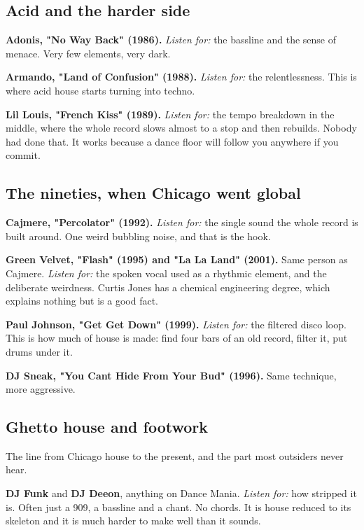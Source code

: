 \subsection{Acid and the harder side}\label{li01_canon-acid-and-the-harder-side}

\textbf{Adonis, "No Way Back" (1986).} \emph{Listen for:} the bassline and the sense of menace. Very
few elements, very dark.

\textbf{Armando, "Land of Confusion" (1988).} \emph{Listen for:} the relentlessness. This is where
acid house starts turning into techno.

\textbf{Lil Louis, "French Kiss" (1989).} \emph{Listen for:} the tempo breakdown in the middle, where
the whole record slows almost to a stop and then rebuilds. Nobody had done that. It works
because a dance floor will follow you anywhere if you commit.

\subsection{The nineties, when Chicago went global}\label{li01_canon-the-nineties-when-chicago-went-global}

\textbf{Cajmere, "Percolator" (1992).} \emph{Listen for:} the single sound the whole record is built
around. One weird bubbling noise, and that is the hook.

\textbf{Green Velvet, "Flash" (1995) and "La La Land" (2001).} Same person as Cajmere. \emph{Listen
for:} the spoken vocal used as a rhythmic element, and the deliberate weirdness. Curtis Jones
has a chemical engineering degree, which explains nothing but is a good fact.

\textbf{Paul Johnson, "Get Get Down" (1999).} \emph{Listen for:} the filtered disco loop. This is how
much of house is made: find four bars of an old record, filter it, put drums under it.

\textbf{DJ Sneak, "You Can\textquotesingle t Hide From Your Bud" (1996).} Same technique, more aggressive.

\subsection{Ghetto house and footwork}\label{li01_canon-ghetto-house-and-footwork}

The line from Chicago house to the present, and the part most outsiders never hear.

\textbf{DJ Funk} and \textbf{DJ Deeon}, anything on Dance Mania. \emph{Listen for:} how stripped it is.
Often just a 909, a bassline and a chant. No chords. It is house reduced to its skeleton and
it is much harder to make well than it sounds.

